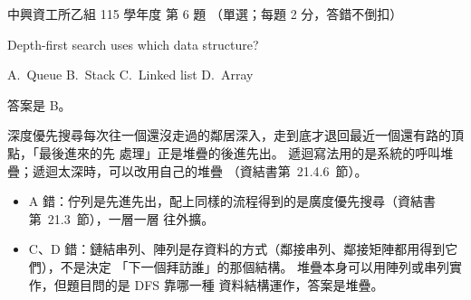 \begin{pastexam}[label={px:nchu-115-is-06}]{中興資工所乙組 115 學年度 第 6 題}
（單選；每題 2 分，答錯不倒扣）

Depth-first search uses which data structure?

A.~Queue \qquad B.~Stack \qquad C.~Linked list \qquad D.~Array
\end{pastexam}

\begin{pastsoln}
答案是 B。

深度優先搜尋每次往一個還沒走過的鄰居深入，走到底才退回最近一個還有路的頂點，「最後進來的先
處理」正是堆疊的後進先出。 遞迴寫法用的是系統的呼叫堆疊；遞迴太深時，可以改用自己的堆疊
（資結書第~21.4.6~節）。
\begin{itemize}
\item A 錯：佇列是先進先出，配上同樣的流程得到的是廣度優先搜尋（資結書第~21.3~節），一層一層
往外擴。
\item C、D 錯：鏈結串列、陣列是存資料的方式（鄰接串列、鄰接矩陣都用得到它們），不是決定
「下一個拜訪誰」的那個結構。 堆疊本身可以用陣列或串列實作，但題目問的是 DFS 靠哪一種
資料結構運作，答案是堆疊。
\end{itemize}
\end{pastsoln}
